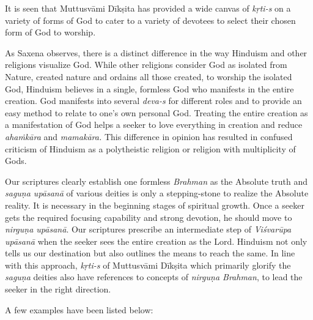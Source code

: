 It is seen that Muttusvāmi Dīkṣita has provided a wide canvas of \textit{kṛti-s} on a variety of forms of God to cater to a variety of devotees to select their chosen form of God to worship.

As Saxena observes, there is a distinct difference in the way Hinduism and other religions visualize God. While other religions consider God as isolated from Nature, created nature and ordains all those created, to worship the isolated God, Hinduism believes in a single, formless God who manifests in the entire creation. God manifests into several \textit{deva-s} for different roles and to provide an easy method to relate to one’s own personal God. Treating the entire creation as a manifestation of God helps a seeker to love everything in creation and reduce \textit{ahaṁkāra} and \textit{mamakāra.} This difference in opinion has resulted in confused criticism of Hinduism as a polytheistic religion or religion with multiplicity of Gods.

Our scriptures clearly establish one formless \textit{Brahman} as the Absolute truth and \textit{saguṇa upāsanā} of various deities is only a stepping-stone to realize the Absolute reality. It is necessary in the beginning stages of spiritual growth. Once a seeker gets the required focusing capability and strong devotion, he should move to \textit{nirguṇa upāsanā}. Our scriptures prescribe an intermediate step of \textit{Viśvarūpa upāsanā} when the seeker sees the entire creation as the Lord. Hinduism not only tells us our destination but also outlines the means to reach the same. In line with this approach, \textit{kṛti-s} of Muttusvāmi Dīkṣita which primarily glorify the \textit{saguṇa} deities also have references to concepts of \textit{nirguṇa Brahman}, to lead the seeker in the right direction.

A few examples have been listed below:


